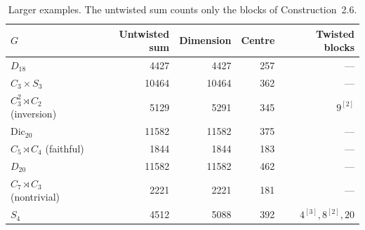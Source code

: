\documentclass[11pt]{amsart}
\theoremstyle{definition}
\begin{document}
\begin{table}[ht]
\centering\small
\begin{tabular}{@{}lrrrr@{}}
\toprule
$G$ & Untwisted sum & Dimension & Centre & Twisted blocks\\
\midrule
$D_{18}$ & 4427 & 4427 & 257 & ---\\
$C_3\times S_3$ & 10464 & 10464 & 362 & ---\\
$C_3^2\rtimes C_2$ (inversion) & 5129 & 5291 & 345 & $9^{[2]}$\\
$\mathrm{Dic}_{20}$ & 11582 & 11582 & 375 & ---\\
$C_5\rtimes C_4$ (faithful) & 1844 & 1844 & 183 & ---\\
$D_{20}$ & 11582 & 11582 & 462 & ---\\
$C_7\rtimes C_3$ (nontrivial) & 2221 & 2221 & 181 & ---\\
$S_4$ & 4512 & 5088 & 392 & $4^{[3]},8^{[2]},20$\\
\bottomrule
\end{tabular}
\caption{Larger examples. The untwisted sum counts only the blocks of Construction~2.6.}
\end{table}
\end{document}
